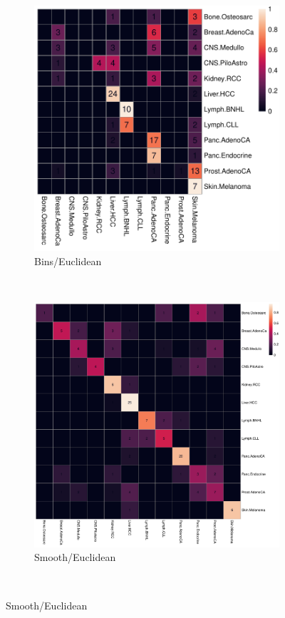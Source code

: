 \begin{figure}[htbp]
    \begin{subfigure}{.5\textwidth}
    \includegraphics[scale=0.6]{graphics/confustion_matrix_bins_euclidean.pdf}
    \caption{Bins/Euclidean}
    \label{fig:bin_euclidean}
    \end{subfigure}
    ~
    \begin{subfigure}{.5\textwidth}
    
    \includegraphics[scale=0.25]{graphics/confustion_matrix_smooth_euclid.pdf}
    \caption{Smooth/Euclidean}
    \label{fig:smooth_euclidean}
    \end{subfigure} \\
    \vspace{0.5cm}
    

\end{figure}
